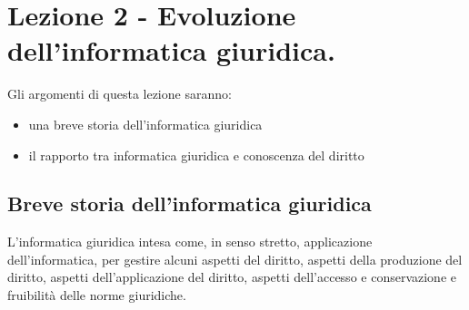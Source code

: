 \chapter{Lezione 2 - Evoluzione dell'informatica giuridica.}
Gli argomenti di questa lezione saranno:
\begin{itemize}
    \item una breve storia dell'informatica giuridica 
    \item il rapporto tra informatica giuridica e conoscenza del diritto 
\end{itemize}

\section{Breve storia dell'informatica giuridica}
L'informatica giuridica intesa come, in senso stretto, applicazione dell'informatica, per gestire alcuni aspetti del diritto, aspetti della produzione del diritto, aspetti dell'applicazione del diritto, aspetti dell'accesso e conservazione e fruibilità delle norme giuridiche. 
